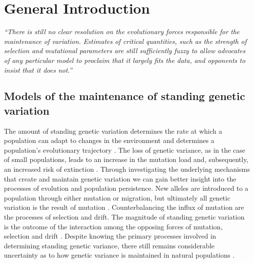 \chapter{General Introduction}

\begin{center}
    \textit{“There is still no clear resolution on the evolutionary forces responsible for the maintenance \newline of variation. Estimates of critical quantities, such as the strength of selection and mutational parameters are still sufficiently fuzzy to allow advocates of any particular model to proclaim \newline that it largely fits the data, and opponents to insist that it does not.”} \newline \citet[][Chapter 28, pp. 1077]{Wals18c28}
\end{center}

\section{Models of the maintenance of standing genetic variation} 
The amount of standing genetic variation determines the rate at which a population can adapt to changes in the environment and determines a population’s evolutionary trajectory \citep{Land79, Hans08}. The loss of genetic variance, as in the case of small populations, leads to an increase in the mutation load and, subsequently, an increased risk of extinction \citep{Mull64, Lync90, Land94}. Through investigating the underlying mechanisms that create and maintain genetic variation we can gain better insight into the processes of evolution and population persistence. New alleles are introduced to a population through either mutation or migration, but ultimately all genetic variation is the result of mutation \citep{Falc96, John05}. Counterbalancing the influx of mutation are the processes of selection and drift. The magnitude of standing genetic variation is the outcome of the interaction among the opposing forces of mutation, selection and drift \citep{Fish30}. Despite knowing the primary processes involved in determining standing genetic variance, there still remains considerable uncertainty as to how genetic variance is maintained in natural populations \citep{Ture85, John05}. \par

